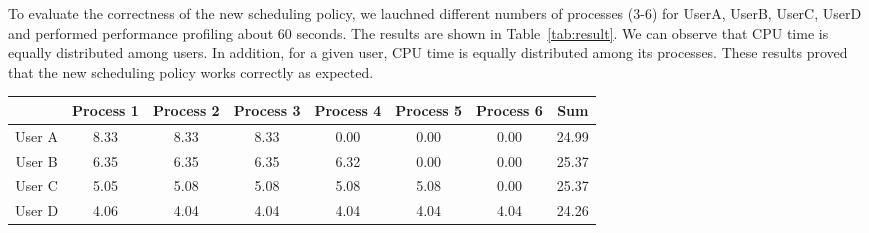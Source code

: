 \documentclass[11pt]{article}
\begin{document}
To evaluate the correctness of the new scheduling policy, we lauchned different numbers of processes (3-6) for UserA, UserB, UserC, UserD and performed performance profiling about 60 seconds. The results are shown in Table~\ref{tab:result}. We can observe that CPU time is equally distributed among users. In addition, for a given user, CPU time is equally distributed among its processes. These results proved that the new scheduling policy works correctly as expected. 

\begin{table*}[htbp]
\centering
\begin{tabular}{ |c|c|c|c|c|c|c|c| }
\hline
& Process 1 & Process 2 & Process 3 & Process 4 & Process 5 & Process 6 & Sum \\ \hline
User A & 8.33 & 8.33 & 8.33 & 0.00 & 0.00 & 0.00 & 24.99 \\ \hline
User B & 6.35 & 6.35 & 6.35 & 6.32 & 0.00 & 0.00 & 25.37 \\ \hline
User C & 5.05 & 5.08 & 5.08 & 5.08 & 5.08 & 0.00 & 25.37 \\ \hline
User D & 4.06 & 4.04 & 4.04 & 4.04 & 4.04 & 4.04 & 24.26 \\ \hline
\end{tabular}
\caption{CPU time percentage of processes for each user.}
\vspace{-.15in}
\label{tab:result}
\end{table*}

%

\end{document}
